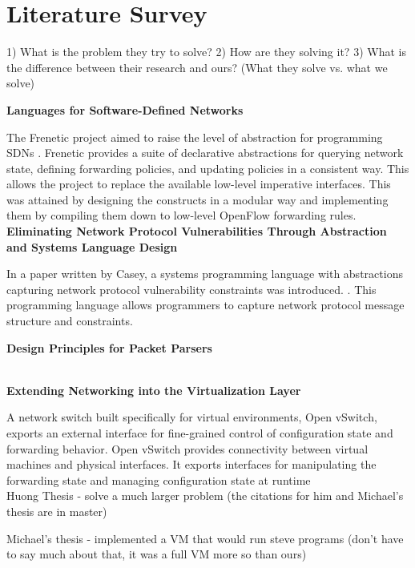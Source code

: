 
\section{Literature Survey}
1) What is the problem they try to solve?
2) How are they solving it?
3) What is the difference between their research and ours?  (What they solve vs. what we solve)

\textbf{Languages for Software-Defined Networks} 

The Frenetic project aimed to raise the level of abstraction for 
programming SDNs \cite{Foster2013}. Frenetic provides a suite of declarative abstractions 
for querying network state, defining forwarding policies, and updating 
policies in a consistent way. This allows the project to replace the 
available low-level imperative interfaces. This was attained by designing 
the constructs in a modular way and implementing them by compiling
them down to low-level OpenFlow forwarding rules. \\

\noindent \textbf{Eliminating Network Protocol Vulnerabilities Through Abstraction and Systems Language Design
}

In a paper written by Casey, a systems programming language with abstractions capturing network
protocol vulnerability constraints was introduced. \cite{Casey2013}. This programming language
allows programmers to capture network protocol message structure and constraints. 


\noindent \textbf{Design Principles for Packet Parsers}


\cite{Gibb2013} \\

\noindent \textbf{Extending Networking into the Virtualization Layer}

A network switch built specifically for virtual environments, Open vSwitch, exports an external interface
for fine-grained control of configuration state and forwarding behavior. Open vSwitch provides
connectivity between virtual machines and physical interfaces. It exports interfaces for manipulating
the forwarding state and managing configuration state at runtime  
\cite{Pfaff2009} \\



Huong Thesis - solve a much larger problem (the citations for him and Michael's thesis are in master)

Michael's thesis - implemented a VM that would run steve programs (don't have to say much about that, it was a full VM more so than ours)

